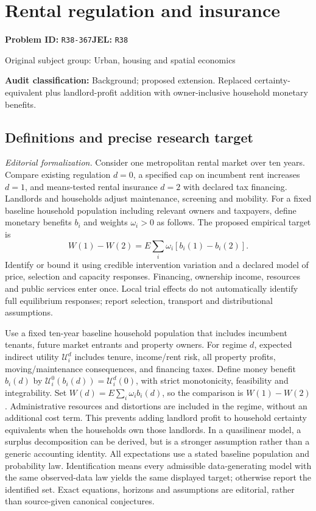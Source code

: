 \documentclass[11pt,a4paper]{article}
\begin{document}
\section*{Rental regulation and insurance}
\textbf{Problem ID:} \texttt{R38-367}\quad \textbf{JEL:} \texttt{R38}\par
\label{problem:OP-0463}
{\sffamily\small\color{muted}Original subject group: Urban, housing and spatial economics\par}
\label{definitions:problem:30007745}
\textbf{Audit classification:} Background; proposed extension. Replaced certainty-equivalent plus landlord-profit addition with owner-inclusive household monetary benefits.
\subsection*{Definitions and precise research target}
\textit{Editorial formalization.} Consider one metropolitan rental market over ten years. Compare existing regulation \(d=0\), a specified cap on incumbent rent increases \(d=1\), and means-tested rental insurance \(d=2\) with declared tax financing. Landlords and households adjust maintenance, screening and mobility. For a fixed baseline household population including relevant owners and taxpayers, define monetary benefits \(b_i\) and weights \(\omega_i>0\) as follows. The proposed empirical target is \[W(1)-W(2)=E\sum_i\omega_i[b_i(1)-b_i(2)].\] Identify or bound it using credible intervention variation and a declared model of price, selection and capacity responses. Financing, ownership income, resources and public services enter once. Local trial effects do not automatically identify full equilibrium responses; report selection, transport and distributional assumptions.

Use a fixed ten-year baseline household population that includes incumbent tenants, future market entrants and property owners. For regime \(d\), expected indirect utility \(\mathcal U_i^d\) includes tenure, income/rent risk, all property profits, moving/maintenance consequences, and financing taxes. Define money benefit \(b_i(d)\) by \(\mathcal U_i^0(b_i(d))=\mathcal U_i^d(0)\), with strict monotonicity, feasibility and integrability. Set \(W(d)=E\sum_i\omega_i b_i(d)\), so the comparison is \(W(1)-W(2)\). Administrative resources and distortions are included in the regime, without an additional cost term. This prevents adding landlord profit to household certainty equivalents when the households own those landlords. In a quasilinear model, a surplus decomposition can be derived, but is a stronger assumption rather than a generic accounting identity. All expectations use a stated baseline population and probability law. Identification means every admissible data-generating model with the same observed-data law yields the same displayed target; otherwise report the identified set. Exact equations, horizons and assumptions are editorial, rather than source-given canonical conjectures.
\end{document}
